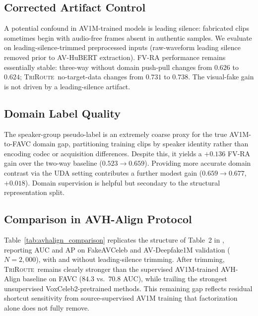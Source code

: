 \documentclass{article}
\newcommand{\method}{\textsc{TriRoute}}
\begin{document}
\subsection{Corrected Artifact Control}

A potential confound in AV1M-trained models is leading silence: fabricated clips sometimes begin with audio-free frames absent in authentic samples. We evaluate on leading-silence-trimmed preprocessed inputs (raw-waveform leading silence removed prior to AV-HuBERT extraction). FV-RA performance remains essentially stable: three-way without domain push-pull changes from $0.626$ to $0.624$; \method\ no-target-data changes from $0.731$ to $0.738$. The visual-fake gain is not driven by a leading-silence artifact.

\subsection{Domain Label Quality}
\label{sec:domain_label_quality}

The speaker-group pseudo-label is an extremely coarse proxy for the true AV1M-to-FAVC domain gap, partitioning training clips by speaker identity rather than encoding codec or acquisition differences. Despite this, it yields a $+0.136$ FV-RA gain over the two-way baseline ($0.523 \to 0.659$). Providing more accurate domain contrast via the UDA setting contributes a further modest gain ($0.659 \to 0.677$, $+0.018$). Domain supervision is helpful but secondary to the structural representation split.

\subsection{Comparison in AVH-Align Protocol}

Table~\ref{tab:avhalign_comparison} replicates the structure of Table~2 in \citet{smeu2025avhalign}, reporting AUC and AP on FakeAVCeleb and AV-Deepfake1M validation ($N=2{,}000$), with and without leading-silence trimming. After trimming, \method\ remains clearly stronger than the supervised AV1M-trained AVH-Align baseline on FAVC ($84.3$ vs.\ $70.8$ AUC), while trailing the strongest unsupervised VoxCeleb2-pretrained methods. This remaining gap reflects residual shortcut sensitivity from source-supervised AV1M training that factorization alone does not fully remove.
\end{document}
